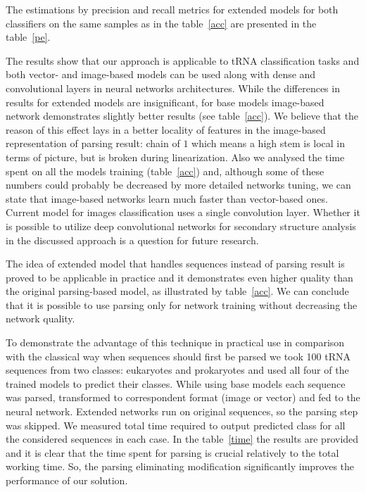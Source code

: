 \documentclass[runningheads]{llncs}
\begin{document}
The estimations by precision and recall metrics for extended models for both classifiers on the same samples as in the  table~\ref{acc} are presented in the table~\ref{pe}.



The results show that our approach is applicable to tRNA classification tasks and both vector- and image-based models can be used along with dense and convolutional layers in neural networks architectures.
While the differences in results for extended models are insignificant, for base models image-based network demonstrates slightly better results (see table~\ref{acc}).
We believe that the reason of this effect lays in a better locality of features in the image-based representation of parsing result: chain of $1$ which means a high stem is local in terms of picture, but is broken during linearization. 
Also we analysed the time spent on all the models training (table~\ref{acc}) and, although some of these numbers could probably be decreased by more detailed networks tuning, we can state that image-based networks learn much faster than vector-based ones.
Current model for images classification uses a single convolution layer.
Whether it is possible to utilize deep convolutional networks for secondary structure analysis in the discussed approach is a question for future research.

The idea of extended model that handles sequences instead of parsing result is proved to be applicable in practice and it demonstrates even higher quality than the original parsing-based model, as illustrated by table~\ref{acc}.
We can conclude that it is possible to use parsing only for network training without decreasing the network quality.

To demonstrate the advantage of this technique in practical use 
in comparison with the classical way when sequences should first be parsed we took 100 tRNA sequences from two classes: eukaryotes and prokaryotes and used all four of the trained models to predict their classes. While using base models each sequence was parsed, transformed to correspondent format (image or vector) and fed to the neural network. Extended networks run on original sequences, so the parsing step was skipped. We measured total time required to output predicted class for all the considered sequences in each case. In the table~\ref{time} the results are provided and it is clear that the time spent for parsing is crucial relatively to the total working time. So, the parsing eliminating modification significantly improves the performance of our solution.
\end{document}
